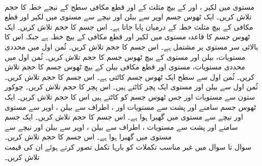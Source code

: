 \\
مستوی  میں لکیر ،  اور  کے بیچ مثلث کے اور  قطع مکافی سطح   کے نیچے  خطہ کا حجم تلاش کریں۔
ایک ٹھوس جسم  اوپر سے بیلن  اور نیچے سے مستوی  میں لکیر  اور قطع مکافی   کے بیچ مثلث   خطہ کے درمیان پایا جاتا ہے۔ اس جسم  کا حجم تلاش کریں۔
ایک ٹھوس جسم  کا قاعدہ مستوی  میں  لکیر  اور قطع مکافی  کے بیچ خطہ ہے جبکہ اس کا بالائی سر مستوی  پر مشتمل ہے۔  اس جسم کا حجم تلاش کریں۔
ثُمن  اول میں  محددی مستویات،  بیلن  اور مستوی  کے بیچ ٹھوس جسم کا حجم تلاش کریں۔ 
ثُمن اول میں  محددی مستویات، مستوی   اور قطع مکافی بیلن  کے بیچ ٹھوس جسم کا حجم تلاش کریں۔
ثُمن اول سے  سطح  ایک ٹھوس جسم کاٹتی ہے۔ اس جسم کا حجم تلاش کریں۔
ثُمن اول سے بیلن  اور مستوی   ایک  پچر کاٹتے ہیں۔ اس پچر کا حجم تلاش کریں۔
چوکور ستون    سے مستویات   اور   جس ٹھوس جسم کو کاٹتے ہیں اس کا حجم تلاش کریں۔
ایک ٹھوس جسم  سامنے اور پشت سے  مستویات  اور ،  اطراف سے بیلن ، اوپر سے مستوی  اور نیچے سے مستوی  میں گھیرا ہوا ہے۔ اس جسم کا حجم تلاش کریں۔
ایک جسم سامنے اور پشت سے مستویات ، اطراف سے بیلن  ، اوپر سے بیلن  اور نیچے سے مستوی  میں گھیرا ہوا ہے۔ اس جسم کا حجم تلاش کریں۔
\\
سوال  تا سوال  میں غیر مناسب تکملات کو بارہا تکمل تصور کرتے ہوئے ان  کی قیمت تلاش کریں۔

